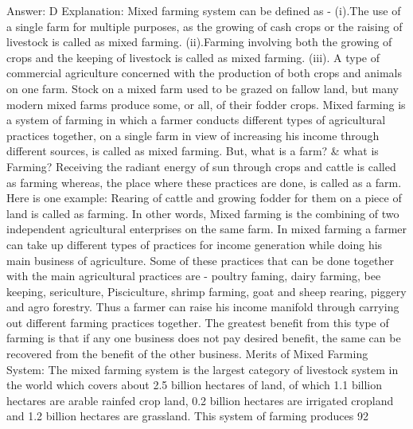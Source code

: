 Answer: D
Explanation: Mixed farming system can be defined as - (i).The use of a single farm for multiple purposes, as the growing of cash crops or the raising of livestock is called as mixed farming. (ii).Farming involving both the growing of crops and the keeping of livestock is called as mixed farming. (iii). A type of commercial agriculture concerned with the production of both crops and animals on one farm. Stock on a mixed farm used to be grazed on fallow land, but many modern mixed farms produce some, or all, of their fodder crops. Mixed farming is a system of farming in which a farmer conducts different types of agricultural practices together, on a single farm in view of increasing his income through different sources, is called as mixed farming. But, what is a farm? & what is Farming? Receiving the radiant energy of sun through crops and cattle is called as farming whereas, the place where these practices are done, is called as a farm. Here is one example: Rearing of cattle and growing fodder for them on a piece of land is called as farming. In other words, Mixed farming is the combining of two independent agricultural enterprises on the same farm. In mixed farming a farmer can take up different types of practices for income generation while doing his main business of agriculture. Some of these practices that can be done together with the main agricultural practices are - poultry faming, dairy farming, bee keeping, sericulture, Pisciculture, shrimp farming, goat and sheep rearing, piggery and agro forestry. Thus a farmer can raise his income manifold through carrying out different farming practices together. The greatest benefit from this type of farming is that if any one business does not pay desired benefit, the same can be recovered from the benefit of the other business. Merits of Mixed Farming System: The mixed farming system is the largest category of livestock system in the world which covers about 2.5 billion hectares of land, of which 1.1 billion hectares are arable rainfed crop land, 0.2 billion hectares are irrigated cropland and 1.2 billion hectares are grassland. This system of farming produces 92%